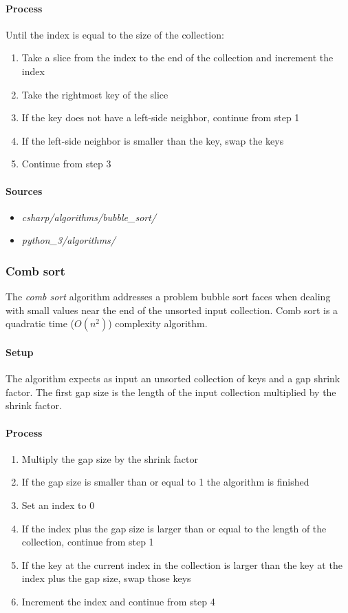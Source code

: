 \documentclass{article}
\begin{document}
\paragraph{Process}
Until the index is equal to the size of the collection:
\begin{enumerate}
\item{Take a slice from the index to the end of the collection and increment the index}
\item{Take the rightmost key of the slice}
\item{If the key does not have a left-side neighbor, continue from step 1}
\item{If the left-side neighbor is smaller than the key, swap the keys}
\item{Continue from step 3}
\end{enumerate}

\begin{samepage}
  \paragraph{Sources}
  \begin{itemize}
  \item{{\em csharp/algorithms/bubble\_sort/}}
  \item{{\em python\_3/algorithms/}}
  \end{itemize}
\end{samepage}


\subsubsection{Comb sort}
The {\em comb sort} algorithm addresses a problem bubble sort faces when dealing with small values near the end of
the unsorted input collection. Comb sort is a quadratic time (\(O(n^2)\)) complexity algorithm.

\paragraph{Setup}
The algorithm expects as input an unsorted collection of keys and a gap shrink factor. The first gap size is the
length of the input collection multiplied by the shrink factor.

\paragraph{Process}
\begin{enumerate}
\item{Multiply the gap size by the shrink factor}
\item{If the gap size is smaller than or equal to 1 the algorithm is finished}
\item{Set an index to 0}
\item{If the index plus the gap size is larger than or equal to the length of the collection, continue from step 1}
\item{If the key at the current index in the collection is larger than the key at the index plus the gap size,
  swap those keys}
\item{Increment the index and continue from step 4}
\end{enumerate}
\end{document}
